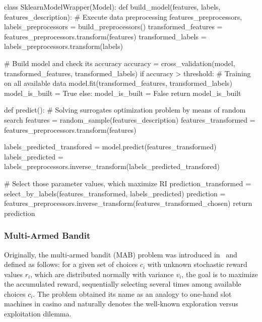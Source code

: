 \begin{code}[language=Python, caption=Scikit-learn linear model wrapper pseudo-code., label=impl: sklearn model wrapper pseudo-code]
class SklearnModelWrapper(Model):
	def build_model(features, labels, features_description):
		# Execute data preprocessing
		features_preprocessors, labels_preprocessors = build_preprocessors()
		transformed_features = features_preprocessors.transform(features)
	 	transformed_labels = labels_preprocessors.transform(labels)
	 	
	 	# Build model and check its accuracy
	 	accuracy = cross_validation(model, transformed_features, transformed_labels)
	 	if accuracy > threshold:
	 		# Training on all available data
	 		model.fit(transformed_features, transformed_labels)
	 		model_is_built = True
	 	else:
	 		model_is_built = False
	 	return model_is_built
	 
	 def predict():
	 	# Solving surrogates optimization problem by means of random search
	 	features = random_sample(features_description)
	 	features_transformed = features_preprocessors.transform(features)
	 	
	 	labels_predicted_transfored = model.predict(features_transformed)
	 	labels_predicted = labels_preprocessors.inverse_transform(labels_predicted_transfored)
	 	
	 	# Select those parameter values, which maximize RI
	 	prediction_transformed = select_by_labels(features_transformed, labels_predicted)
	 	prediction = features_preprocessors.inverse_transform(features_transformed_chosen)
		return prediction
\end{code}

\subsubsection{Multi-Armed Bandit}\label{impl: FRAMAB}
Originally, the multi-armed bandit (MAB) problem was introduced in~\cite{robbins1952some} and defined as follows: for a given set of choices $c_i$ with unknown stochastic reward values $r_i$, which are distributed normally with variance $v_i$, the goal is to maximize the accumulated reward, sequentially selecting several times among available choices $c_i$. The problem obtained its name as an analogy to one-hand slot machines in casino and naturally denotes the well-known exploration versus exploitation dilemma.

